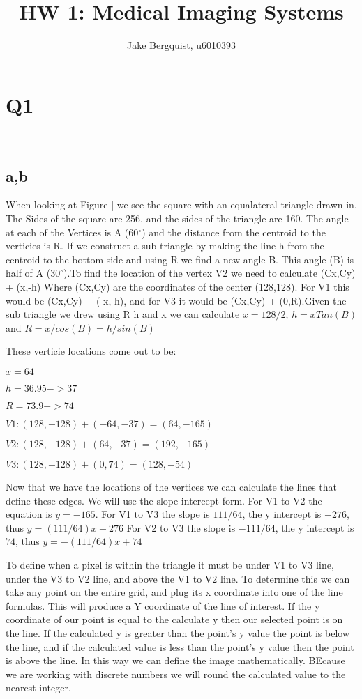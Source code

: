 \documentclass[12pt]{article}
\newcommand{\degrees}{{$^{\circ}$}}
\begin{document}
\title{HW 1: Medical Imaging Systems}
\author{Jake Bergquist, u6010393 }
\maketitle

\section{Q1}\
\subsection{a,b}
When looking at Figure | we see the square with an equalateral triangle drawn in. The Sides of the square are 256, and the sides of the triangle are 160. The angle at each of the Vertices is A (60\degrees) and the distance from the centroid to the verticies is R. If we construct a sub triangle by making the line h from the centroid to the bottom side and using R we find a new angle B. This angle (B) is half of A (30\degrees).To find the location of the vertex V2 we need to calculate (Cx,Cy) + (x,-h) Where (Cx,Cy) are the coordinates of the center (128,128). For V1 this would be (Cx,Cy) + (-x,-h), and for V3 it would be (Cx,Cy) + (0,R).Given the sub triangle we drew using R h and x we can calculate $x = 128/2$, $h = xTan(B)$ and $R = x/cos(B) =  h/sin(B)$


These verticie locations come out to be:

$x = 64$

$h = 36.95 -> 37$

$R = 73.9 -> 74$

$V1: (128,-128) + (-64,-37) = (64,-165)$

$V2: (128,-128) + (64,-37) = (192,-165)$

$V3 : (128,-128) + (0,74) = (128,-54)$

Now that we have the locations of the vertices we can calculate the lines that define these edges. We will use the slope intercept form.
For V1 to V2 the equation is $y = -165$.
For V1 to V3 the slope is $111/64$, the y intercept is $-276$, thus $y = (111/64)x - 276$
For V2 to V3 the slope is $-111/64$, the y intercept is $74$, thus $y = -(111/64)x + 74$

To define when a pixel is within the triangle it must be under V1 to V3 line, under the V3 to V2 line, and above the V1 to V2 line. To determine this we can take any point on the entire grid, and plug its x coordinate into one of the line formulas. This will produce a Y coordinate of the line of interest. If the y coordinate of our point is equal to the calculate y then our selected point is on the line. If the calculated y is greater than the point's y value the point is below the line, and if the calculated value is less than the point's y value then the point is above the line. In this way we can define the image mathematically. BEcause we are working with discrete numbers we will round the calculated value to the nearest integer.





\end{document}
